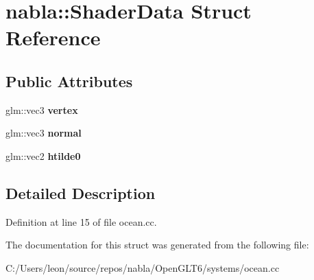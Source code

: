 \hypertarget{structnabla_1_1_shader_data}{}\section{nabla\+::Shader\+Data Struct Reference}
\label{structnabla_1_1_shader_data}
\subsection*{Public Attributes}
\begin{DoxyCompactItemize}
\item 
\mbox{\label{structnabla_1_1_shader_data_a8c435e84b14c47a587f5f30021e9becc}} 
glm\+::vec3 {\bfseries vertex}
\item 
\mbox{\label{structnabla_1_1_shader_data_aa4d6af9e58acbe7d07097f4521cc4867}} 
glm\+::vec3 {\bfseries normal}
\item 
\mbox{\label{structnabla_1_1_shader_data_a4596a82a68ab6cd7ba94525fbe301398}} 
glm\+::vec2 {\bfseries htilde0}
\end{DoxyCompactItemize}


\subsection{Detailed Description}


Definition at line 15 of file ocean.\+cc.



The documentation for this struct was generated from the following file\+:\begin{DoxyCompactItemize}
\item 
C\+:/\+Users/leon/source/repos/nabla/\+Open\+G\+L\+T6/systems/ocean.\+cc\end{DoxyCompactItemize}
